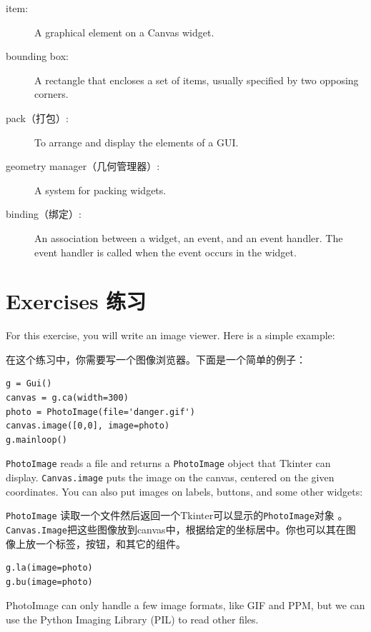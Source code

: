 \documentclass[10pt]{book}
\begin{document}
\begin{CJK}{UTF8}{gbsn}
\begin{description}
\item[item:] A graphical element on a Canvas widget.

\item[bounding box:] A rectangle that encloses a set of items,
usually specified by two opposing corners.

\item[pack（打包）:] To arrange and display the elements of a GUI.

\item[geometry manager（几何管理器）:] A system for packing widgets.

\item[binding（绑定）:] An association between a widget, an event, and
an event handler.  The event handler is called when the event
occurs in the widget.

\end{description}


\section{Exercises 练习}

\begin{exercise}

For this exercise, you will write an image viewer.  Here is
a simple example:

在这个练习中，你需要写一个图像浏览器。下面是一个简单的例子：

\begin{verbatim}
g = Gui()
canvas = g.ca(width=300)
photo = PhotoImage(file='danger.gif')
canvas.image([0,0], image=photo)
g.mainloop()
\end{verbatim}
%
{\tt PhotoImage} reads a file and returns a {\tt PhotoImage} object
that Tkinter can display.  {\tt Canvas.image} puts the image on the
canvas, centered on the given coordinates.  You can also put images on
labels, buttons, and some other widgets:

{\tt PhotoImage} 读取一个文件然后返回一个Tkinter可以显示的{\tt PhotoImage}对象
。{\tt Canvas.Image}把这些图像放到canvas中，根据给定的坐标居中。你也可以其在图
像上放一个标签，按钮，和其它的组件。

\begin{verbatim}
g.la(image=photo)
g.bu(image=photo)
\end{verbatim}
%
PhotoImage can only handle a few image formats, like GIF and PPM, 
but we can use the Python Imaging Library (PIL) to read other
files.


\end{exercise}
\end{CJK}
\end{document}
